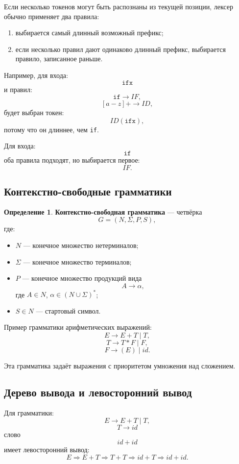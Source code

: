 \documentclass[12pt,a4paper]{article}
\theoremstyle{definition}
\newtheorem{definition}{Определение}
\theoremstyle{plain}
\begin{document}
Если несколько токенов могут быть распознаны из текущей позиции, лексер обычно применяет два правила:

\begin{enumerate}
    \item выбирается самый длинный возможный префикс;
    \item если несколько правил дают одинаково длинный префикс, выбирается правило, записанное раньше.
\end{enumerate}

Например, для входа:
\[
\texttt{ifx}
\]
и правил:
\[
\texttt{if} \to IF,
\]
\[
[a-z]+ \to ID,
\]
будет выбран токен:
\[
ID(\texttt{ifx}),
\]
потому что он длиннее, чем \texttt{if}.

Для входа:
\[
\texttt{if}
\]
оба правила подходят, но выбирается первое:
\[
IF.
\]

\subsection{Контекстно-свободные грамматики}

\begin{definition}
\textbf{Контекстно-свободная грамматика} --- четвёрка
\[
G=(N,\Sigma,P,S),
\]
где:
\begin{itemize}
    \item $N$ --- конечное множество нетерминалов;
    \item $\Sigma$ --- конечное множество терминалов;
    \item $P$ --- конечное множество продукций вида
    \[
    A\to \alpha,
    \]
    где $A\in N$, $\alpha\in (N\cup\Sigma)^*$;
    \item $S\in N$ --- стартовый символ.
\end{itemize}
\end{definition}

Пример грамматики арифметических выражений:
\[
E \to E + T \mid T,
\]
\[
T \to T * F \mid F,
\]
\[
F \to (E) \mid id.
\]

Эта грамматика задаёт выражения с приоритетом умножения над сложением.

\subsection{Дерево вывода и левосторонний вывод}

Для грамматики:
\[
E \to E+T \mid T,
\]
\[
T \to id
\]
слово
\[
id+id
\]
имеет левосторонний вывод:
\[
E \Rightarrow E+T \Rightarrow T+T \Rightarrow id+T \Rightarrow id+id.
\]
\end{document}
